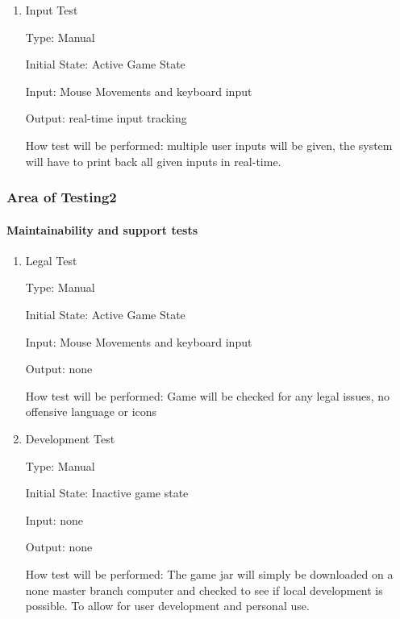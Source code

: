 \documentclass[12pt, titlepage]{article}
\begin{document}
\begin{enumerate}
					
\item{Input Test\\}

Type: Manual
					
Initial State: Active Game State
					
Input: Mouse Movements and keyboard input
					
Output: real-time input tracking 
					
How test will be performed: multiple user inputs will be given, the system will have to print back all given inputs in real-time. 

\end{enumerate}

\subsubsection{Area of Testing2}

\paragraph{Maintainability and support tests}

\begin{enumerate}

\item{Legal Test\\}

Type: Manual
					
Initial State: Active Game State
					
Input: Mouse Movements and keyboard input
					
Output: none
					
How test will be performed: Game will be checked for any legal issues, no offensive language or icons 

\item{Development Test\\}

Type: Manual
					
Initial State: Inactive game state
					
Input: none
					
Output: none
					
How test will be performed: The game jar will simply be downloaded on a none master branch computer and checked to see if local development is possible. To allow for user development and personal use. 


\end{enumerate}
\end{document}

